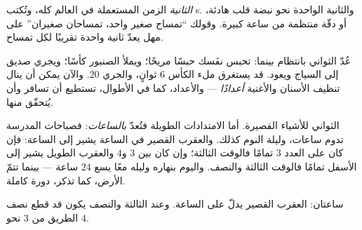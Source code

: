\begin{definition}[الثانية]\label{def:g2:measuring-time:second}
\emph{الثانية}  الزمن المستعملة في العالم كله،
وتُكتب \unit{s}. والثانية الواحدة نحو نبضة قلب هادئة، أو دقّة
منتظمة من ساعة كبيرة. وقولك ``تمساح صغير واحد، تمساحان صغيران''
على مهل يعدّ ثانية واحدة تقريبًا لكل تمساح.
\end{definition}

\begin{example}[جرّب: كم ثانية؟]\label{ex:g2:measuring-time:count}
عُدّ الثواني بانتظام بينما: تحبس نفَسك حبسًا مريحًا؛ ويملأ
الصنبور كأسًا؛ ويجري صديق إلى السياج ويعود. قد يستغرق ملء الكأس
$6$ ثوانٍ، والجري $20$. والآن يمكن أن ينال تنظيف الأسنان والأغنية
\emph{أعدادًا} --- والأعداد، كما في الأطوال، تستطيع أن تسافر وأن
يُتحقّق منها.
\end{example}

\begin{example}\label{ex:g2:measuring-time:clock}
الثواني للأشياء القصيرة. أما الامتدادات الطويلة فتُعدّ
\emph{بالساعات}: فصباحات المدرسة تدوم ساعات، وليلة
النوم كذلك. والعقرب القصير في الساعة يشير إلى الساعة: فإن كان على
العدد $3$ تمامًا فالوقت الثالثة؛ وإن كان بين $3$ و$4$ والعقرب الطويل
يشير إلى الأسفل تمامًا فالوقت الثالثة والنصف. واليوم بنهاره وليله
معًا يسع $24$ ساعة --- بينما تتمّ الأرض، كما تذكر، دورة كاملة.
\end{example}

\begin{omfigure}

{\small ساعتان: العقرب القصير يدلّ على الساعة. وعند الثالثة
والنصف يكون قد قطع نصف الطريق من $3$ نحو $4$.}
\end{omfigure}

